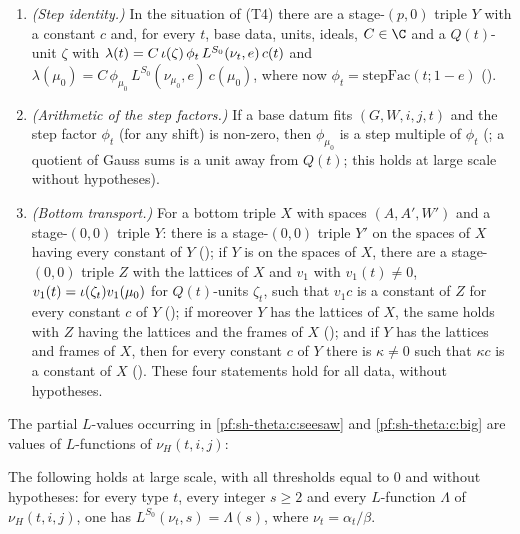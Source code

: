 \begin{enumerate}[label=(\roman*),leftmargin=*]
$\epsilon$ the local epsilon factor.
\item\label{pf:sh-theta:c:big} \emph{(Step identity.)} In the situation of (T4) there are a stage-$(p,0)$ triple $Y$ with a
constant $c$ and, for every $t$, base data, units, ideals, $C\in\C$ and a $Q(t)$-unit $\zeta$ with
$\lambda(t)=C\,\iota(\zeta)\,\phi_t\,L^{S_0}(\nu_t,e)\,c(t)$ and
$\lambda(\mu_0)=C\,\phi_{\mu_0}\,L^{S_0}(\nu_{\mu_0},e)\,c(\mu_0)$, where now $\phi_t=\mathrm{stepFac}(t;1-e)$
().
\item\label{pf:sh-theta:c:gauss} \emph{(Arithmetic of the step factors.)} If a base datum fits $(G,W,i,j,t)$ and the step
factor $\phi_t$ (for any shift) is non-zero, then $\phi_{\mu_0}$ is a step multiple of $\phi_t$
(; a quotient of Gauss sums is a unit away from
$Q(t)$; this holds at large scale without hypotheses).
\item\label{pf:sh-theta:c:bottom} \emph{(Bottom transport.)} For a bottom triple $X$ with spaces $(A,A',W')$ and a stage-$(0,0)$
triple $Y$: there is a stage-$(0,0)$ triple $Y'$ on the spaces of $X$ having every constant of $Y$
(); if $Y$ is on the spaces of $X$, there are a
stage-$(0,0)$ triple $Z$ with the lattices of $X$ and $v_1$ with $v_1(t)\ne0$, $v_1(t)=\iota(\zeta_t)v_1(\mu_0)$ for
$Q(t)$-units $\zeta_t$, such that $v_1c$ is a constant of $Z$ for every constant $c$ of $Y$
(); if moreover $Y$ has the lattices of $X$, the
same holds with $Z$ having the lattices and the frames of $X$
(); and if $Y$ has the lattices and frames of $X$, then for
every constant $c$ of $Y$ there is $\kappa\ne0$ such that $\kappa c$ is a constant of $X$
(). These four statements hold for all data, without
hypotheses.
\end{enumerate}

The partial $L$-values occurring in \ref{pf:sh-theta:c:seesaw} and \ref{pf:sh-theta:c:big} are values of $L$-functions of
$\nu_H(t,i,j)$:

\begin{lemma}\label{pf:sh-theta:partialL}
The following holds at large scale, with all thresholds equal to $0$ and without hypotheses: for every type $t$, every integer
$s\ge2$ and every $L$-function $\Lambda$ of $\nu_H(t,i,j)$, one has $L^{S_0}(\nu_t,s)=\Lambda(s)$, where $\nu_t=\alpha_t/\beta$.
\end{lemma}


